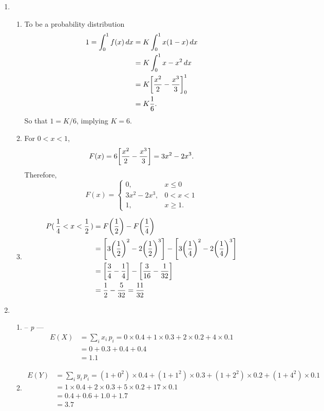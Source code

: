 \documentclass[11pt,paper=a4,abstract=on,parskip=half,DIV=calc,compact]{scrartcl}
\let\originalleft\left
\let\originalright\right
\renewcommand{\left}{\mathopen{}\mathclose\bgroup\originalleft}
\renewcommand{\right}{\aftergroup\egroup\originalright}
\begin{document}
\begin{ExerciseList}
\Answer
\begin{enumerate}
\item
\begin{enumerate}
\item
{
To be a probability distribution
\begin{align*}
1 = \int_0^1 f(x)\, dx  &= K \int_0^1 x(1-x)\, dx\\
                        &= K \int_0^1 x -x^2 \, dx\\
                        & = K \left[ \frac{x^2}{2} - \frac{x^3}{3} \right]^1_0\\
                        & = K \frac{1}{6} .
\end{align*}
So that $1 =K/6 $, implying $K=6$.
}
\item
{
For $0 < x < 1$,
$$
F(x) = 6\left[ \frac{x^2}{2} - \frac{x^3}{3} \right] = 3x^2 -2x^3.
$$
Therefore,
$$F(x) = \begin{cases} 0, & x \leq 0\\
          3x^2 -2x^3, & 0 < x < 1\\
          1, & x \geq 1.
          \end{cases}
$$ }
\item
{
\begin{align*} P(\, \frac{1}{4} < x < \frac{1}{2} \, )
& = F\left( \frac{1}{2} \right) -F\left( \frac{1}{4} \right)\\
& = \left[ 3 \left( \frac{1}{2} \right)^2 -2 \left( \frac{1}{2}\right)^3 \right]
- \left[ 3 \left( \frac{1}{4} \right)^2 -2 \left( \frac{1}{4} \right)^3 \right]\\
& = \left[ \frac{3}{4} -\frac{1}{4} \right] - \left[ \frac{3}{16} -\frac{1}{32} \right] \\
&= \frac{1}{2} - \frac{5}{32} = \frac{11}{32}
\end{align*}
}
\end{enumerate}
\item
\begin{enumerate}
\item -- {\em *p} --- 
{ \begin{align*}
E(X) &= \sum_i x_i \, p_i = 0 \times 0.4 + 1 \times 0.3 + 2 \times 0.2 + 4 \times 0.1\\
& = 0 + 0.3 + 0.4 + 0.4\\
&= 1.1
\end{align*}
}
\item
{
\begin{align*}
E(Y) &= \sum_i y_i \, p_i = (1+0^2)\times
 0.4 + (1+1^2) \times 0.3 + (1+2^2) \times 0.2 + (1+4^2) \times 0.1 \\
&= 1 \times 0.4 + 2 \times 0.3 +5 \times 0.2 + 17 \times 0.1\\
& = 0.4 +0.6 +1.0 + 1.7 \\
&= 3.7
\end{align*}
}
\end{enumerate}


\end{enumerate}
\end{ExerciseList}
\end{document}
